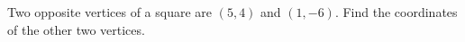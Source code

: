 Two opposite vertices of a square are $(5,4)$ and $(1,-6)$. Find the coordinates of the other two vertices.
